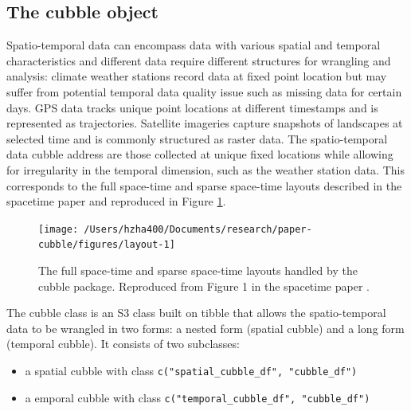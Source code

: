 \documentclass[
  shortnames]{jss}
\providecommand{\tightlist}{%
  \setlength{\itemsep}{0pt}\setlength{\parskip}{0pt}}
\begin{document}
\hypertarget{object}{%
\subsection{The cubble object}\label{object}}

Spatio-temporal data can encompass data with various spatial and temporal characteristics and different data require different structures for wrangling and analysis: climate weather stations record data at fixed point location but may suffer from potential temporal data quality issue such as missing data for certain days. GPS data tracks unique point locations at different timestamps and is represented as trajectories. Satellite imageries capture snapshots of landscapes at selected time and is commonly structured as raster data. The spatio-temporal data cubble address are those collected at unique fixed locations while allowing for irregularity in the temporal dimension, such as the weather station data. This corresponds to the full space-time and sparse space-time layouts described in the spacetime paper \citep{spacetime} and reproduced in Figure \ref{fig:layout}.

\begin{CodeChunk}
\begin{figure}

{\centering \texttt{[image: /Users/hzha400/Documents/research/paper-cubble/figures/layout-1]} 

}

\caption[The full space-time and sparse space-time layouts handled by the cubble package]{The full space-time and sparse space-time layouts handled by the cubble package. Reproduced from Figure 1 in the spacetime paper \citep{spacetime}.}\label{fig:layout}
\end{figure}
\end{CodeChunk}

The cubble class is an S3 class built on tibble that allows the spatio-temporal data to be wrangled in two forms: a nested form (spatial cubble) and a long form (temporal cubble). It consists of two subclasses:

\begin{itemize}
\tightlist
\item
  a spatial cubble with class \texttt{c("spatial\_cubble\_df",\ "cubble\_df")}
\item
  a emporal cubble with class \texttt{c("temporal\_cubble\_df",\ "cubble\_df")}
\end{itemize}
\end{document}
